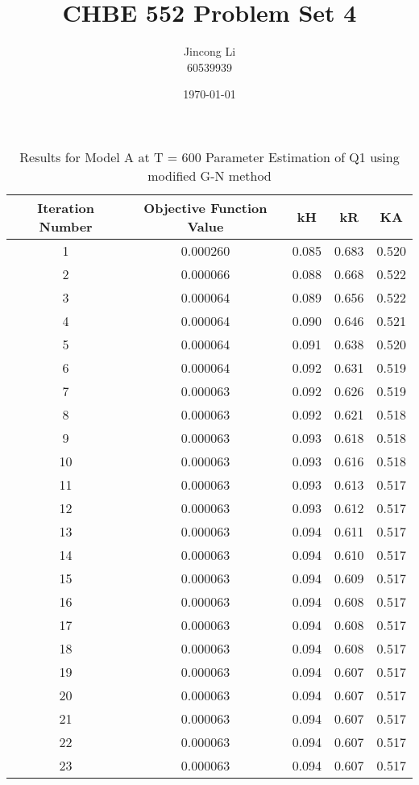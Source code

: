 \documentclass[a4paper,12pt]{article} %
\begin{document}
\setlength{\parskip}{1em} 
\setlength{\parindent}{0pt}
\newcommand{\vect}[1]{\mathbf{#1}}

\title{CHBE 552 Problem Set 4}
\author{Jincong Li \\ 60539939}
\date{\today}
\maketitle

\begin{table}[ht]
\caption{Results for Model A at T = 600 Parameter Estimation of Q1 using modified G-N method}
\centering
\begin{tabular}{|c|c|c|c|c|}
    \hline
    Iteration Number & Objective Function Value & kH & kR & KA \\
    \hline
    1 & 0.000260 & 0.085 & 0.683 & 0.520 \\
2 & 0.000066 & 0.088 & 0.668 & 0.522 \\
3 & 0.000064 & 0.089 & 0.656 & 0.522 \\
4 & 0.000064 & 0.090 & 0.646 & 0.521 \\
5 & 0.000064 & 0.091 & 0.638 & 0.520 \\
6 & 0.000064 & 0.092 & 0.631 & 0.519 \\
7 & 0.000063 & 0.092 & 0.626 & 0.519 \\
8 & 0.000063 & 0.092 & 0.621 & 0.518 \\
9 & 0.000063 & 0.093 & 0.618 & 0.518 \\
10 & 0.000063 & 0.093 & 0.616 & 0.518 \\
11 & 0.000063 & 0.093 & 0.613 & 0.517 \\
12 & 0.000063 & 0.093 & 0.612 & 0.517 \\
13 & 0.000063 & 0.094 & 0.611 & 0.517 \\
14 & 0.000063 & 0.094 & 0.610 & 0.517 \\
15 & 0.000063 & 0.094 & 0.609 & 0.517 \\
16 & 0.000063 & 0.094 & 0.608 & 0.517 \\
17 & 0.000063 & 0.094 & 0.608 & 0.517 \\
18 & 0.000063 & 0.094 & 0.608 & 0.517 \\
19 & 0.000063 & 0.094 & 0.607 & 0.517 \\
20 & 0.000063 & 0.094 & 0.607 & 0.517 \\
21 & 0.000063 & 0.094 & 0.607 & 0.517 \\
22 & 0.000063 & 0.094 & 0.607 & 0.517 \\
23 & 0.000063 & 0.094 & 0.607 & 0.517 \\
    \hline
\end{tabular}
\end{table}
\end{document}
